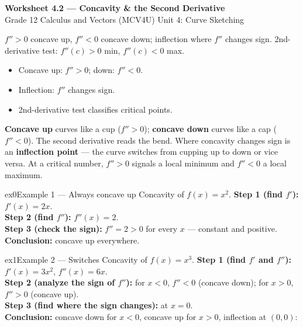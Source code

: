\documentclass[11pt]{article}
\begin{document}
\begin{center}
{\LARGE\bfseries\color{titleblue}Worksheet 4.2 --- Concavity \& the Second Derivative}\\[2pt]
{\small Grade 12 Calculus and Vectors (MCV4U) \textperiodcentered{} Unit 4: Curve Sketching}
\end{center}

\begin{ideabox}
$f''>0$ concave up, $f''<0$ concave down; inflection where $f''$ changes sign. 2nd-derivative test: $f''(c)>0$ min, $f''(c)<0$ max.
\begin{itemize}[leftmargin=*,itemsep=2pt]
  \item Concave up: $f''>0$; down: $f''<0$.
  \item Inflection: $f''$ changes sign.
  \item 2nd-derivative test classifies critical points.
\end{itemize}
\end{ideabox}

\begin{learnbox}
\textbf{Concave up} curves like a cup ($f''>0$); \textbf{concave down} curves like a cap ($f''<0$). The second derivative reads the bend.
Where concavity changes sign is an \textbf{inflection point} — the curve switches from cupping up to down or vice versa.
At a critical number, $f''>0$ signals a local minimum and $f''<0$ a local maximum.
\end{learnbox}


\begin{example}{ex0}{Example 1 --- Always concave up}
Concavity of $f(x)=x^2$.\soln
\textbf{Step 1 (find $f'$):} $f'(x)=2x$.\\[3pt]
\textbf{Step 2 (find $f''$):} $f''(x)=2$.\\[3pt]
\textbf{Step 3 (check the sign):} $f''=2>0$ for every $x$ --- constant and positive.\\[3pt]
\textbf{Conclusion:} concave up everywhere.
\end{example}

\begin{example}{ex1}{Example 2 --- Switches}
Concavity of $f(x)=x^3$.\soln
\textbf{Step 1 (find $f'$ and $f''$):} $f'(x)=3x^2$, $f''(x)=6x$.\\[3pt]
\textbf{Step 2 (analyze the sign of $f''$):} for $x<0$, $f''<0$ (concave down); for $x>0$, $f''>0$ (concave up).\\[3pt]
\textbf{Step 3 (find where the sign changes):} at $x=0$.\\[3pt]
\textbf{Conclusion:} concave down for $x<0$, concave up for $x>0$, inflection at $(0,0)$:
\end{example}
\end{document}
